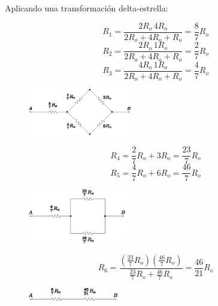 \documentclass[letter,11pt]{article}
\begin{document}
\begin{enumerate}
Aplicando una transformación delta-estrella:

\begin{equation*}
    R_1 = \frac{2R_o\,4R_o}{2R_o+4R_o+R_o} = \frac{8}{7}R_o
\end{equation*}
\begin{equation*}
    R_2 = \frac{2R_o\,1R_o}{2R_o+4R_o+R_o} = \frac{2}{7}R_o
\end{equation*}
\begin{equation*}
    R_3 = \frac{4R_o\,1R_o}{2R_o+4R_o+R_o} = \frac{4}{7}R_o
\end{equation*}

\begin{figure}[!h]
\centering
\includegraphics[width=0.40\textwidth]{resources/figura5.eps}
\end{figure}

\begin{equation*}
    R_4 = \frac{2}{7}R_o+3R_o = \frac{23}{7}R_o
\end{equation*}
\begin{equation*}
    R_5 = \frac{4}{7}R_o+6R_o = \frac{46}{7}R_o
\end{equation*}

\begin{figure}[!h]
\centering
\includegraphics[width=0.38\textwidth]{resources/figura6.eps}
\end{figure}

\begin{equation*}
    R_6 = \frac{(\frac{23}{7}R_o)(\frac{46}{7}R_o)}
          {\frac{23}{7}R_o+\frac{46}{7}R_o}
        = \frac{46}{21}R_o
\end{equation*}

\begin{figure}[!h]
\centering
\includegraphics[width=0.35\textwidth]{resources/figura7.eps}
\end{figure}


\end{enumerate}
\end{document}
